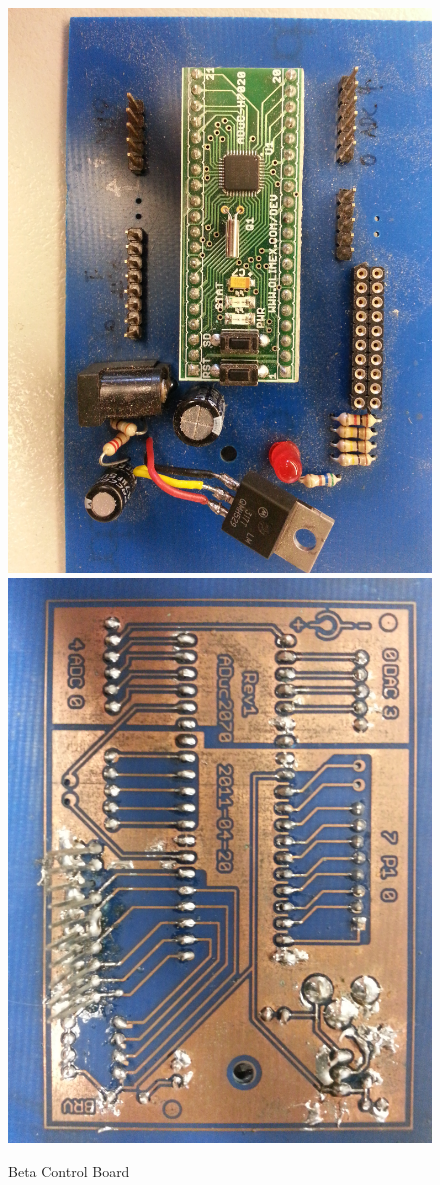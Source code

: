 \begin{figure}
	\begin{center}
		\label{fig:PCB_digital_beta}
		\includegraphics[scale=1,width=.45\textwidth]{Images/PCB_DigBetaA.jpg}
		\includegraphics[scale=1,width=.45\textwidth]{Images/PCB_DigBetaB.jpg}  
		\caption{Beta Control Board}
	\end{center}
\end{figure}

